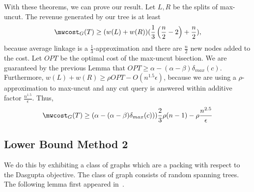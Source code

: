 With these theorems, we can prove our result. Let $L,R$ be the splits of max-uncut.
The revenue generated by our tree is at least
\[
    \mwcost_G(T) \geq (w(L) + w(R))(\frac{1}{3}\left(\frac{n}{2}-2\right) + \frac{n}{2}),
\]
because average linkage is a $\frac{1}{3}$-approximation and there are $\frac{n}{2}$ new nodes added to the cost.
Let $OPT$ be the optimal cost of the max-uncut bisection. We are guaranteed by the previous Lemma that
$OPT \geq \alpha - (\alpha-\beta)\delta_{max}(c)$. Furthermore, $w(L) + w(R) \geq \rho OPT - O(n^{1.5}{\epsilon})$, because we are using a $\rho$-approximation to max-uncut and any cut query is answered within additive factor $\frac{n^{1.5}}{\epsilon}$. Thus,
\[
\mwcost_G(T) \geq (\alpha - (\alpha-\beta)\delta_{max}(c)))\frac{2}{3}\rho (n-1) - \rho\frac{n^{2.5}}{\epsilon}
\]

\subsection{Lower Bound Method 2}
We do this by exhibiting a class of graphs which are a packing with respect to the Dasgupta objective. The class of graph consists of random spanning trees. The following lemma first appeared in~\cite{goyal2009expanders}.

